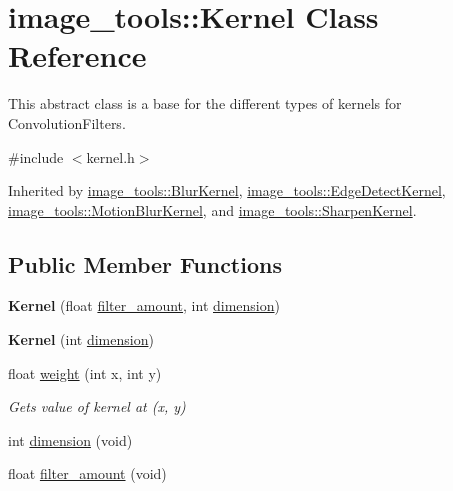 \hypertarget{classimage__tools_1_1Kernel}{}\section{image\+\_\+tools\+:\+:Kernel Class Reference}
\label{classimage__tools_1_1Kernel}


This abstract class is a base for the different types of kernels for Convolution\+Filters.  




{\ttfamily \#include $<$kernel.\+h$>$}



Inherited by \hyperlink{classimage__tools_1_1BlurKernel}{image\+\_\+tools\+::\+Blur\+Kernel}, \hyperlink{classimage__tools_1_1EdgeDetectKernel}{image\+\_\+tools\+::\+Edge\+Detect\+Kernel}, \hyperlink{classimage__tools_1_1MotionBlurKernel}{image\+\_\+tools\+::\+Motion\+Blur\+Kernel}, and \hyperlink{classimage__tools_1_1SharpenKernel}{image\+\_\+tools\+::\+Sharpen\+Kernel}.

\subsection*{Public Member Functions}
\begin{DoxyCompactItemize}
\item 
{\bfseries Kernel} (float \hyperlink{classimage__tools_1_1Kernel_ab7d9f22db768926def56f237d6a84f78}{filter\+\_\+amount}, int \hyperlink{classimage__tools_1_1Kernel_a1235fc3f48da943eb72cc9067a5cf385}{dimension})\hypertarget{classimage__tools_1_1Kernel_a55af8f691477451f3abc8a32501caf00}{}\label{classimage__tools_1_1Kernel_a55af8f691477451f3abc8a32501caf00}

\item 
{\bfseries Kernel} (int \hyperlink{classimage__tools_1_1Kernel_a1235fc3f48da943eb72cc9067a5cf385}{dimension})\hypertarget{classimage__tools_1_1Kernel_ad9ba583858da294ae862f9225328606c}{}\label{classimage__tools_1_1Kernel_ad9ba583858da294ae862f9225328606c}

\item 
float \hyperlink{classimage__tools_1_1Kernel_af0f212cd428328026b5d8105e554ad3d}{weight} (int x, int y)
\begin{DoxyCompactList}\small\item\em Gets value of kernel at (x, y) \end{DoxyCompactList}\item 
int \hyperlink{classimage__tools_1_1Kernel_a1235fc3f48da943eb72cc9067a5cf385}{dimension} (void)
\item 
float \hyperlink{classimage__tools_1_1Kernel_ab7d9f22db768926def56f237d6a84f78}{filter\+\_\+amount} (void)
\end{DoxyCompactItemize}
